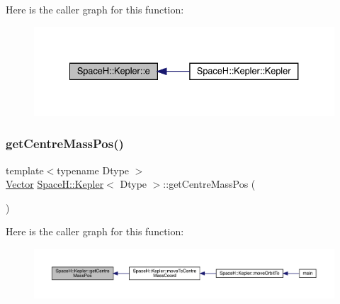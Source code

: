 Here is the caller graph for this function\+:
\nopagebreak
\begin{figure}[H]
\begin{center}
\leavevmode
\includegraphics[width=334pt]{struct_space_h_1_1_kepler_a17a4205719ad64fe7a3b05f86cab7486_icgraph}
\end{center}
\end{figure}
\mbox{\label{struct_space_h_1_1_kepler_a0db141671a25e3f20b1f784256658fb1}} 
\subsubsection{\texorpdfstring{get\+Centre\+Mass\+Pos()}{getCentreMassPos()}}
{\footnotesize\ttfamily template$<$typename Dtype $>$ \\
\mbox{\hyperlink{struct_space_h_1_1_kepler_aa0f5e7ecefa626a0e32a9435dd9662cd}{Vector}} \mbox{\hyperlink{struct_space_h_1_1_kepler}{Space\+H\+::\+Kepler}}$<$ Dtype $>$\+::get\+Centre\+Mass\+Pos (\begin{DoxyParamCaption}{ }\end{DoxyParamCaption})\hspace{0.3cm}{\ttfamily [inline]}}

Here is the caller graph for this function\+:
\nopagebreak
\begin{figure}[H]
\begin{center}
\leavevmode
\includegraphics[width=350pt]{struct_space_h_1_1_kepler_a0db141671a25e3f20b1f784256658fb1_icgraph}
\end{center}
\end{figure}
\mbox{\label{struct_space_h_1_1_kepler_ab3c523b35f5d0c4f25fdf3bf46830c08}} 

